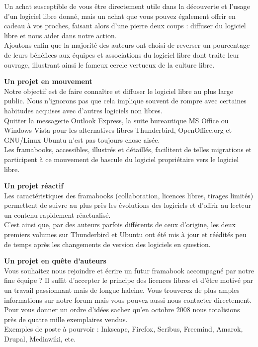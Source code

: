 {Un achat susceptible de vous être directement utile dans la découverte et l'usage d'un logiciel libre donné, mais un achat que vous pouvez également offrir en cadeau à vos proches, faisant alors d'une pierre deux coups : diffuser du logiciel libre et nous aider dans notre action.\\
Ajoutons enfin que la majorité des auteurs ont choisi de reverser un pourcentage de leurs bénéfices aux équipes et associations du logiciel libre dont traite leur ouvrage, illustrant ainsi le fameux cercle vertueux de la culture libre.\par
\textbf{Un projet en mouvement}\\
Notre objectif est de faire connaître et diffuser le logiciel libre au plus large public. Nous n'ignorons pas que cela implique souvent de rompre avec certaines habitudes acquises avec d'autres logiciels non libres.\\
Quitter la messagerie Outlook Express, la suite bureautique MS Office ou Windows Vista pour les alternatives libres Thunderbird, OpenOffice.org et GNU/Linux Ubuntu n'est pas toujours chose aisée.\\
Les framabooks, accessibles, illustrés et détaillés, facilitent de telles migrations et participent à ce mouvement de bascule du logiciel propriétaire vers le logiciel libre.\par
\newpage
\textbf{Un projet réactif}\\
Les caractéristiques des framabooks (collaboration, licences libres, tirages limités) permettent de suivre au plus près les évolutions des logiciels et d'offrir au lecteur un contenu rapidement réactualisé.\\
C'est ainsi que, par des auteurs parfois différents de ceux d'origine, les deux premiers volumes sur Thunderbird et Ubuntu ont été mis à jour et réédités peu de temps après les changements de version des logiciels en question.\par
\textbf{Un projet en quête d'auteurs}\\
Vous souhaitez nous rejoindre et écrire un futur framabook accompagné par notre fine équipe ? Il suffit d'accepter le principe des licences libres et d'être motivé par un travail passionnant mais de longue haleine. Vous trouverez de plus amples informations sur notre forum mais vous pouvez aussi nous contacter directement.\\
Pour vous donner un ordre d'idées sachez qu'en octobre 2008 nous totalisions près de quatre mille exemplaires vendus.\\
Exemples de poste à pourvoir : Inkscape, Firefox, Scribus, Freemind, Amarok, Drupal, Mediawiki, etc.\par
}
